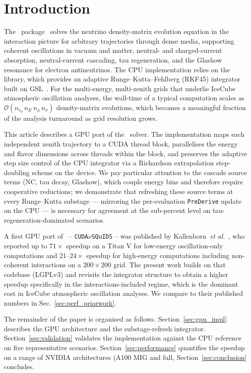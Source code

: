 \section{Introduction}
\label{sec:intro}

The \nusquids\ package~\cite{nusquids2021} solves the neutrino
density-matrix evolution equation in the interaction picture for
arbitrary trajectories through dense media, supporting coherent
oscillations in vacuum and matter, neutral- and charged-current
absorption, neutral-current cascading, tau regeneration, and the
Glashow resonance for electron antineutrinos. The CPU implementation
relies on the \squids~\cite{squids} library, which provides an
adaptive Runge--Kutta--Fehlberg (RKF45) integrator built on
\textsc{GSL}~\cite{gsl}. For the multi-energy, multi-zenith grids that
underlie IceCube atmospheric oscillation analyses, the wall-time of a
typical computation scales as $\mathcal{O}(n_{c_\theta}\, n_E\, n_\rho\,
n_\nu)$ density-matrix evolutions, which becomes a meaningful fraction
of the analysis turnaround as grid resolution grows.

This article describes a GPU port of the \nusquids\ solver. The
implementation maps each independent zenith trajectory to a CUDA
thread block, parallelises the energy and flavor dimensions across
threads within the block, and preserves the adaptive step size
control of the CPU integrator via a Richardson extrapolation
step-doubling scheme on the device. We pay particular attention to
the cascade source terms (NC, tau decay, Glashow), which couple
energy bins and therefore require cooperative reductions; we
demonstrate that refreshing these source terms at every Runge--Kutta
substage --- mirroring the per-evaluation \texttt{PreDerive} update
on the CPU --- is necessary for agreement at the sub-percent level on
tau-regeneration-dominated scenarios.

A first GPU port of \nusquids\ -- \texttt{CUDA}$\nu$\texttt{SQuIDS} --
was published by Kallenborn~\textit{et al.}~\cite{kallenborn2019},
who reported up to $71\times$ speedup on a Titan V for low-energy
oscillation-only computations and $21$--$24\times$ speedup for
high-energy computations including non-coherent interactions on a
$200\times200$ grid. The present work builds on that codebase
(LGPLv3) and revisits the integrator structure to obtain a higher
speedup specifically in the interactions-included regime, which is
the dominant cost in IceCube atmospheric oscillation analyses.
We compare to their published numbers in
Sec.~\ref{sec:perf_priorwork}.

The remainder of the paper is organised as follows.
Section~\ref{sec:gpu_impl} describes the GPU architecture and the
substage-refresh integrator. Section~\ref{sec:validation} validates
the implementation against the CPU reference on five representative
scenarios. Section~\ref{sec:performance} quantifies the speedup on a
range of NVIDIA architectures (A100 MIG and full, %
Section~\ref{sec:conclusion} concludes.
